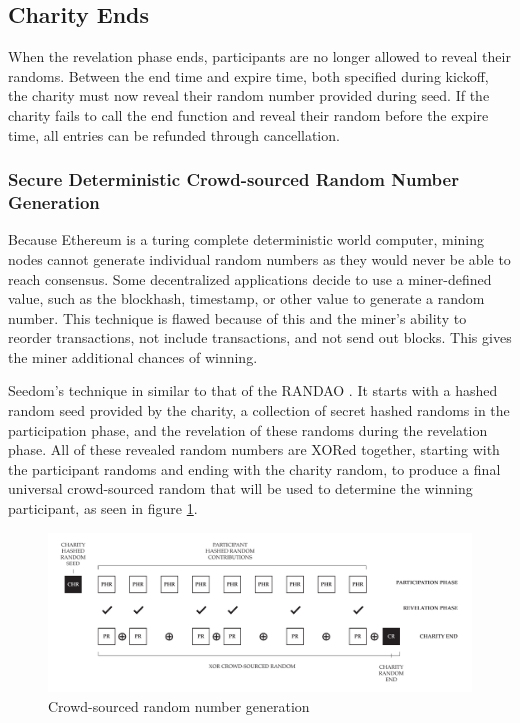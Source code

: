 \documentclass[11pt]{article}
\begin{document}
\subsection{Charity Ends}

When the revelation phase ends, participants are no longer allowed to reveal their randoms. Between the end time and expire time, both specified during kickoff, the charity must now reveal their random number provided during seed. If the charity fails to call the end function and reveal their random before the expire time, all entries can be refunded through cancellation.

\subsubsection{Secure Deterministic Crowd-sourced Random Number Generation}

Because Ethereum is a turing complete deterministic world computer, mining nodes cannot generate individual random numbers as they would never be able to reach consensus. Some decentralized applications decide to use a miner-defined value, such as the blockhash, timestamp, or other value to generate a random number. This technique is flawed because of this and the miner's ability to reorder transactions, not include transactions, and not send out blocks. This gives the miner additional chances of winning.

Seedom's technique in similar to that of the RANDAO \cite{2}. It starts with a hashed random seed provided by the charity, a collection of secret hashed randoms in the participation phase, and the revelation of these randoms during the revelation phase. All of these revealed random numbers are XORed together, starting with the participant randoms and ending with the charity random, to produce a final universal crowd-sourced random that will be used to determine the winning participant, as seen in figure \ref{figure:crowdsourcedRandomNumberGeneration}.

\begin{figure}[H]
\begin{center}
\includegraphics[width=1.0\textwidth]{crowdsourcedRandomNumberGeneration.pdf}
\caption{Crowd-sourced random number generation}
\label{figure:crowdsourcedRandomNumberGeneration}
\end{center}
\end{figure}
\end{document}

